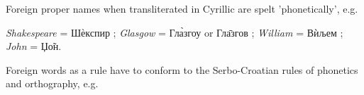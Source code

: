         \newpage

        Foreign proper names when transliterated in Cyrillic are spelt 'phonetically', e.g.

        \textit{Shakespeare} = Ш\`{е}кспир ; \textit{Glasgow} =
        {Гл\`{а}згоу} or {Гл\={а}згов} ; \textit{William} =
        {В\`{и}љем} ; \textit{John} = Џ\~{о}н.

        Foreign words as a rule have to conform to the Serbo-Croatian rules of phonetics and orthography, e.g. 
        
